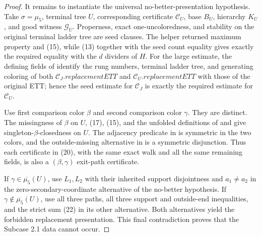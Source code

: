 \begin{proof}
It remains to instantiate the universal no-better-presentation
hypothesis.  Take $\sigma=\mu_5$, terminal tree $U$, corresponding
certificate $\mathcal C_U$, base $B_U$, hierarchy $K_U$, and good witness
$\mathcal G_U$.  Properness, exact one-uncoloredness, and stability on the
original terminal ladder tree are seed clauses.  The helper returned
maximum property and (15), while (13) together with the seed count equality
gives exactly the required equality with the $d$ dividers of $H$.
For the large estimate, the defining fields of
 identify the rung numbers,
terminal ladder tree, and generating coloring of both
$\mathcal C_J.\mathit{replacementETT}$ and
$\mathcal C_U.\mathit{replacementETT}$ with those of the original ETT;
hence the seed estimate for $\mathcal C_J$ is exactly the required estimate
for $\mathcal C_U$.

Use first comparison color $\beta$ and second comparison color $\gamma$.
They are distinct.  The missingness of $\beta$ on $U$, (17), (15), and
the unfolded definitions of  and
 give singleton-$\beta$-closedness on $U$.
The adjacency predicate in  is symmetric
in the two colors, and the outside-missing alternative in
 is a symmetric disjunction.  Thus each certificate
in (20), with the same exact walk and all the same remaining fields, is
also a $(\beta,\gamma)$ exit-path certificate.

If $\gamma\in\overline{\mu_5}(U)$, use $L_1,L_2$ with their inherited
support disjointness and $a_1\ne a_2$ in the zero-secondary-coordinate
alternative of the no-better hypothesis.  If
$\gamma\notin\overline{\mu_5}(U)$, use all three paths, all three support
and outside-end inequalities, and the strict sum (22) in its other
alternative.  Both alternatives yield the forbidden replacement
presentation.  This final contradiction proves that the Subcase 2.1 data
cannot occur.
\end{proof}
